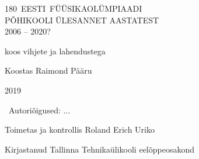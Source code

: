 \documentclass[11pt]{article}
\begin{document}
\begin{titlepage}
    \centering
    \vspace{10cm}
    {\sffamily\Huge \mbox{180 EESTI FÜÜSIKAOLÜMPIAADI}\\ PÕHIKOOLI ÜLESANNET AASTATEST\\ 2006 -- 2020?\par}
    \vspace{1cm}
    {\Large koos vihjete ja lahendustega\par}
    \vfill
    {\Large Koostas Raimond Pääru}

    \vfill

    {\large 2019}
\end{titlepage}

\raggedbottom %
\mbox{}\vfill

\textcopyright~Autoriõigused: ...

\vfill

Toimetas ja kontrollis Roland Erich Uriko

Kirjastanud Tallinna Tehnikaülikooli eelõppeosakond
\vspace{0.5\baselineskip}
\newpage

\tableofcontents
\newpage
\end{document}

